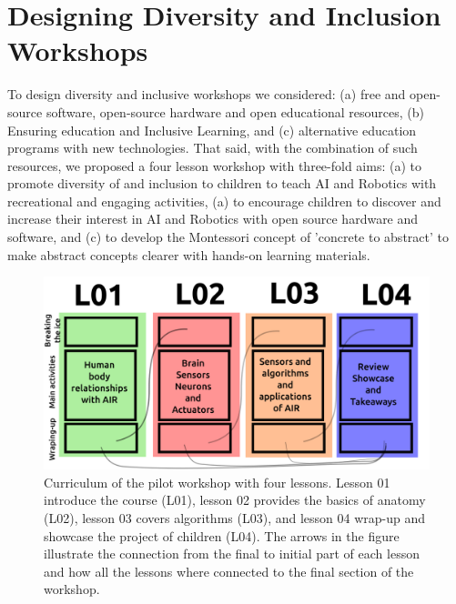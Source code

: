 \documentclass[conference]{IEEEtran}
\begin{document}
\section{Designing Diversity and Inclusion Workshops}
To design diversity and inclusive workshops we considered: (a) free and open-source software, open-source hardware and open educational resources, (b) Ensuring education and Inclusive Learning, and (c) alternative education programs with new technologies.
That said, with the combination of such resources, we proposed a four lesson workshop with three-fold aims:
(a) to promote  diversity of and inclusion to children to teach AI and Robotics with recreational and engaging activities,
(a) to encourage children to discover and increase their interest in AI and Robotics with open source hardware and software, and  
(c) to develop  the Montessori concept of 'concrete to abstract' to make abstract concepts clearer with hands-on learning materials.

\begin{figure}[t]
    \centerline{\includegraphics[width=\linewidth]{drawing-v04.png}} %
    \caption{Curriculum of the pilot workshop with four lessons. 
    Lesson 01 introduce the course (L01), 
    lesson 02 provides the basics of anatomy (L02), 
    lesson 03 covers algorithms (L03), and 
    lesson 04 wrap-up and showcase the project of children (L04).
    The arrows in the figure illustrate the connection from the final to initial part of each lesson and how all the lessons where connected to the final section of the workshop.
    }
    \label{fig:curriculum}
\end{figure}
\end{document}
